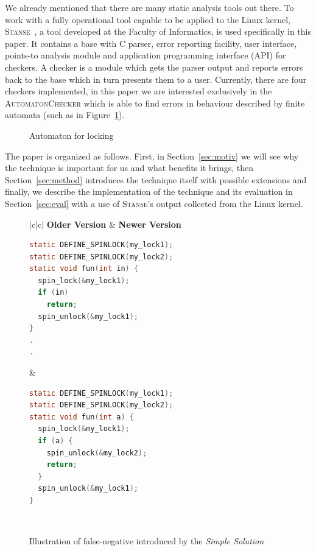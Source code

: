 \documentclass{acm_proc_article-sp}
\newcommand\st{\textsc{Stanse}\xspace}
\begin{document}
We already mentioned that there are many static analysis tools out there. To
work with a fully operational tool capable to be applied to the Linux kernel,
\st~\cite{stanse}, a tool developed at the Faculty of Informatics, is used
specifically in this paper. It contains a base with C parser, error reporting
facility, user interface, points-to analysis module and application
programming interface (API) for checkers. A checker is a module which gets the
parser output and reports errors back to the base which in turn presents them
to a user. Currently, there are four checkers implemented, in this paper we
are interested exclusively in the \textsc{AutomatonChecker} which is able to
find errors in behaviour described by finite automata (such as in
Figure~\ref{fig:automaton}).

\begin{figure}[tb]
\begin{center}

\end{center}
\caption{Automaton for locking}
\label{fig:automaton}
\end{figure}

The paper is organized as follows. First, in Section~\ref{sec:motiv} we will
see why the technique is important for us and what benefits it brings, then
Section~\ref{sec:method} introduces the technique itself with possible
extensions and finally, we describe the implementation of the technique and
its evaluation in Section~\ref{sec:eval} with a use of
\st's output collected from the Linux kernel.

\begin{figure}[tb]
\begin{center}
\begin{tabular}{|c|c|} \hline
\textbf{Older Version} & \textbf{Newer Version} \\ \hline \hline
\begin{lstlisting}[language=C]
static DEFINE_SPINLOCK(my_lock1);
static DEFINE_SPINLOCK(my_lock2);
static void fun(int in) {
  spin_lock(&my_lock1);
  if (in)
    return;
  spin_unlock(&my_lock1);
}
.
.
\end{lstlisting} &
\begin{lstlisting}[language=C]
static DEFINE_SPINLOCK(my_lock1);
static DEFINE_SPINLOCK(my_lock2);
static void fun(int a) {
  spin_lock(&my_lock1);
  if (a) {
    spin_unlock(&my_lock2);
    return;
  }
  spin_unlock(&my_lock1);
}
\end{lstlisting} \\ \hline
\end{tabular}
\end{center}
\caption{Illustration of false-negative introduced by the \emph{Simple
Solution}}
\label{fig:fp_simple}
\end{figure}
\end{document}

